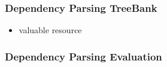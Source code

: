 \documentclass[11pt]{article}
\begin{document}
\subsubsection{Dependency Parsing TreeBank}

\begin{minipage}[l]{.5\linewidth}
    \begin{figure}[H]
        \centering
    \end{figure}    
\end{minipage}\hfill
\begin{minipage}[r]{.48\linewidth}
    \begin{itemize}
        \item valuable resource
    \end{itemize}
\end{minipage}

\subsubsection{Dependency Parsing Evaluation}
\end{document}
